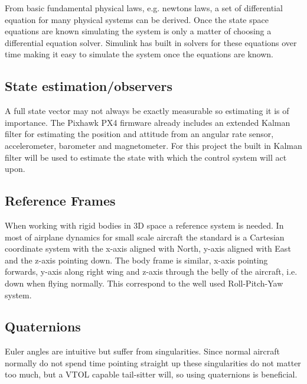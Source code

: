 \documentclass{article}
\begin{document}
From basic fundamental physical laws, e.g. newtons laws, a set of differential equation for many physical systems can be derived.
Once the state space equations are known simulating the system is only a matter of choosing a differential equation solver.
Simulink has built in solvers for these equations over time making it easy to simulate the system once the equations are known.

\subsection{State estimation/observers}
A full state vector may not always be exactly measurable so estimating it is of importance.
The Pixhawk PX4 firmware already includes an extended Kalman filter for estimating the position and attitude from an angular rate sensor, accelerometer, barometer and magnetometer.
For this project the built in Kalman filter will be used to estimate the state with which the control system will act upon.

\subsection{Reference Frames}
When working with rigid bodies in 3D space a reference system is needed.
In most of airplane dynamics for small scale aircraft the standard is a Cartesian coordinate system with the x-axis aligned with North, y-axis aligned with East and the z-axis pointing down.
The body frame is similar, x-axis pointing forwards, y-axis along right wing and z-axis through the belly of the aircraft, i.e. down when flying normally.
This correspond to the well used Roll-Pitch-Yaw system.\cite{nelson}

\subsection{Quaternions}
Euler angles are intuitive but suffer from singularities.
Since normal aircraft normally do not spend time pointing straight up these singularities do not matter too much, but a VTOL capable tail-sitter will, so using quaternions is beneficial.
\end{document}
